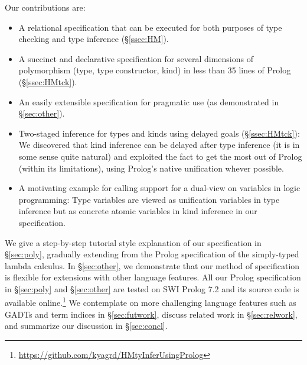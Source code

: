 Our contributions are:
\begin{itemize}\vspace*{-1ex}
\item A relational specification that can be executed for
	both purposes of type checking and type inference (\S\ref{ssec:HM}).
\item A succinct and declarative specification for several dimensions of
	polymorphism (type, type constructor, kind) in less than 35 lines
	of Prolog (\S\ref{ssec:HMtck}).
\item An easily extensible specification for pragmatic use
	(as demonstrated in \S\ref{sec:other}).
\item Two-staged inference for types and kinds using delayed goals
	(\S\ref{ssec:HMtck}):
We discovered that kind inference can be delayed after type inference
(it is in some sense quite natural) and exploited the fact to get the
most out of Prolog (within its limitations), using Prolog's
native unification whever possible.
\item A motivating example for calling support for a dual-view
	on variables in logic programming:
Type variables are viewed as unification variables
in type inference but as concrete atomic variables
in kind inference in our specification.
\end{itemize}

We give a step-by-step tutorial style explanation of our specification in
\S\ref{sec:poly}, gradually extending from the Prolog specification of
the simply-typed lambda calculus. In \S\ref{sec:other}, we demonstrate
that our method of specification is flexible for extensions with
other language features. All our Prolog specification in \S\ref{sec:poly}
and \S\ref{sec:other} are tested on SWI Prolog 7.2 and its source code is
available online.\footnote{
	\url{https://github.com/kyagrd/HMtyInferUsingProlog} }\label{githubURL}
We contemplate on more challenging language features such as GADTs and
term indices in \S\ref{sec:futwork}, discuss related work in
\S\ref{sec:relwork}, and summarize our discussion in \S\ref{sec:concl}.

